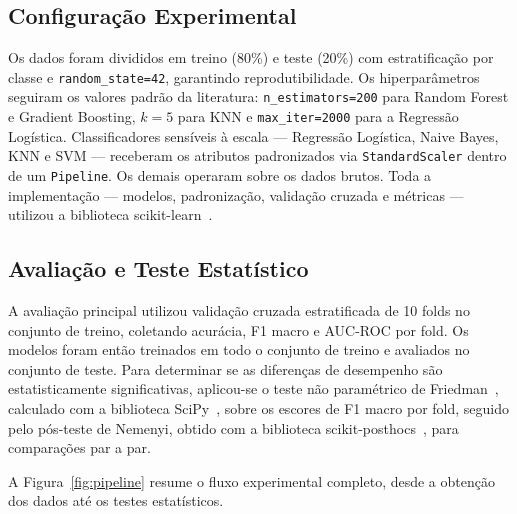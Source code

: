 \documentclass[12pt]{article}
\begin{document}
\subsection{Configuração Experimental}

Os dados foram divididos em treino (80\%) e teste (20\%) com estratificação
por classe e \texttt{random\_state=42}, garantindo reprodutibilidade. Os
hiperparâmetros seguiram os valores padrão da literatura: \texttt{n\_estimators=200}
para Random Forest e Gradient Boosting, $k=5$ para KNN e \texttt{max\_iter=2000}
para a Regressão Logística. Classificadores sensíveis à escala — Regressão
Logística, Naive Bayes, KNN e SVM — receberam os atributos padronizados via
\texttt{StandardScaler} dentro de um \texttt{Pipeline}. Os demais operaram
sobre os dados brutos. Toda a implementação — modelos, padronização, validação
cruzada e métricas — utilizou a biblioteca scikit-learn~\cite{pedregosa2011}.

\subsection{Avaliação e Teste Estatístico}

A avaliação principal utilizou validação cruzada estratificada de 10 folds
no conjunto de treino, coletando acurácia, F1 macro e AUC-ROC por fold.
Os modelos foram então treinados em todo o conjunto de treino e avaliados
no conjunto de teste. Para determinar se as diferenças de desempenho são
estatisticamente significativas, aplicou-se o teste não paramétrico de
Friedman~\cite{demsar2006}, calculado com a biblioteca SciPy~\cite{virtanen2020},
sobre os escores de F1 macro por fold, seguido pelo pós-teste de Nemenyi,
obtido com a biblioteca scikit-posthocs~\cite{terpilowski2019}, para
comparações par a par.

A Figura~\ref{fig:pipeline} resume o fluxo experimental completo, desde a
obtenção dos dados até os testes estatísticos.
\end{document}
